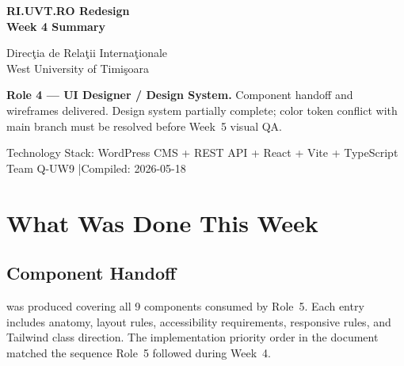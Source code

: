 \documentclass[12pt,a4paper]{article}
\begin{document}
\color{textGray}

\begin{titlepage}
\pagecolor{uvtDarkBlue}\color{white}
\vspace*{2cm}
{\Huge\bfseries RI.UVT.RO Redesign\\[0.35em]
Week 4 Summary\par}
\vspace{0.8cm}
{\Large Direc\c{t}ia de Rela\c{t}ii Interna\c{t}ionale\\
West University of Timi\c{s}oara\par}
\vspace{1.5cm}
\begin{yellowbox}
\color{textGray}
\textbf{Role 4 --- UI Designer / Design System.}
Component handoff and wireframes delivered.
Design system partially complete; color token conflict with main branch
must be resolved before Week~5 visual QA.
\end{yellowbox}
\vfill
{\large Technology Stack: WordPress CMS + REST API + React + Vite + TypeScript\\[4pt]
Team Q-UW9 \quad|\quad Compiled: 2026-05-18}
\vspace{1cm}
\end{titlepage}
\nopagecolor\color{textGray}

\section{What Was Done This Week}

\subsection{Component Handoff}

 was produced covering all 9 components consumed
by Role~5. Each entry includes anatomy, layout rules, accessibility
requirements, responsive rules, and Tailwind class direction. The
implementation priority order in the document matched the sequence Role~5
followed during Week~4.

\vspace{0.6em}
\end{document}
